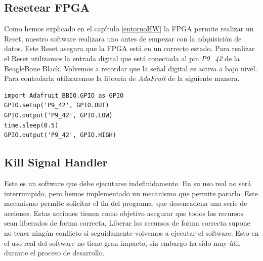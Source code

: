 	\subsection{Resetear FPGA}
		Como hemos explicado en el capítulo \ref{entornoHW} la FPGA permite realizar un Reset, nuestro software realizara uno antes de empezar
		con la adquisición de datos. Este Reset asegura que la FPGA está en un correcto estado. Para realizar el Reset utilizamos la entrada
		digital que está conectada al pin \emph{P9\_42} de la BeagleBone Black. Volvemos a recordar que la señal digital es activa a bajo
		nivel. Para controlarla utilizaremos la librería de \emph{AdaFruit}\cite{AdaFruitGit} de la siguiente manera.
		\begin{lstlisting}[style=myPython]
import Adafruit_BBIO.GPIO as GPIO
GPIO.setup('P9_42', GPIO.OUT)
GPIO.output('P9_42', GPIO.LOW)
time.sleep(0.5)
GPIO.output('P9_42', GPIO.HIGH)
		\end{lstlisting}
	
	\subsection{Kill Signal Handler}
		Este es un software que debe ejecutarse indefinidamente. En su uso real no será interrumpido, pero hemos implementado un mecanismo que
		permite pararlo. Este mecanismo permite solicitar el fin del programa, que desencadena una serie de acciones. Estas acciones tienen
		como objetivo asegurar que todos los recursos sean liberados de forma correcta. Liberar los recursos de forma correcta supone no tener
		ningún conflicto si seguidamente volvemos a ejecutar el software. Esto en el uso real del software no tiene gran impacto, sin embargo
		ha sido muy útil durante el proceso de desarrollo.


